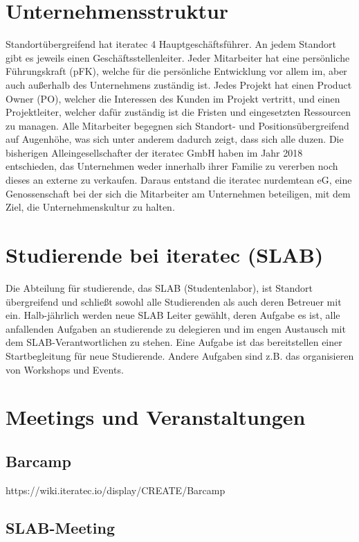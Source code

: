 \section{Unternehmensstruktur}
Standortübergreifend hat iteratec 4 Hauptgeschäftsführer. An jedem Standort gibt es jeweils einen Geschäftsstellenleiter. Jeder Mitarbeiter hat eine persönliche Führungskraft (pFK), welche für die persönliche Entwicklung vor allem im, aber auch außerhalb des Unternehmens zuständig ist. Jedes Projekt hat einen Product Owner (PO), welcher die Interessen des Kunden im Projekt vertritt, und einen Projektleiter, welcher dafür zuständig ist die Fristen und eingesetzten Ressourcen zu managen.
Alle Mitarbeiter begegnen sich Standort- und Positionsübergreifend auf Augenhöhe, was sich unter anderem dadurch zeigt, dass sich alle duzen.
Die bisherigen Alleingesellschafter der iteratec GmbH haben im Jahr 2018 entschieden, das Unternehmen weder innerhalb ihrer Familie zu vererben noch dieses an externe zu verkaufen. Daraus entstand die iteratec nurdemtean eG, eine Genossenschaft bei der sich die Mitarbeiter am Unternehmen beteiligen, mit dem Ziel, die Unternehmenskultur zu halten.

\section{Studierende bei iteratec (SLAB)}
Die Abteilung für studierende, das SLAB (Studentenlabor), ist Standort übergreifend und schließt sowohl alle Studierenden als auch deren Betreuer mit ein. Halb-jährlich werden neue SLAB Leiter gewählt, deren Aufgabe es ist, alle anfallenden Aufgaben an studierende zu delegieren und im engen Austausch mit dem SLAB-Verantwortlichen zu stehen. Eine Aufgabe ist das bereitstellen einer Startbegleitung für neue Studierende. Andere Aufgaben sind z.B. das organisieren von Workshops und Events.

\section{Meetings und Veranstaltungen}

\subsection{Barcamp}
https://wiki.iteratec.io/display/CREATE/Barcamp
\subsection{SLAB-Meeting}
